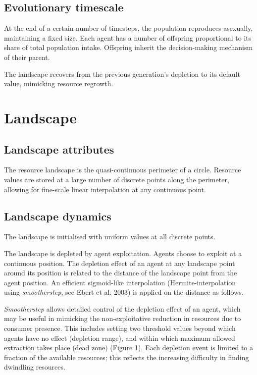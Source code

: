 \hypertarget{evolutionary-timescale}{%
\subsection{Evolutionary timescale}\label{evolutionary-timescale}}

At the end of a certain number of timesteps, the population reproduces
asexually, maintaining a fixed size. Each agent has a number of
offspring proportional to its share of total population intake.
Offspring inherit the decision-making mechanism of their parent.

The landscape recovers from the previous generation's depletion to its
default value, mimicking resource regrowth.

\hypertarget{landscape}{%
\section{Landscape}\label{landscape}}

\hypertarget{landscape-attributes}{%
\subsection{Landscape attributes}\label{landscape-attributes}}

The resource landscape is the quasi-continuous perimeter of a circle.
Resource values are stored at a large number of discrete points along
the perimeter, allowing for fine-scale linear interpolation at any
continuous point.

\hypertarget{landscape-dynamics}{%
\subsection{Landscape dynamics}\label{landscape-dynamics}}

The landscape is initialised with uniform values at all discrete points.

The landscape is depleted by agent exploitation. Agents choose to
exploit at a continuous position. The depletion effect of an agent at
any landscape point around its position is related to the distance of
the landscape point from the agent position. An efficient sigmoid-like
interpolation (Hermite-interpolation using \emph{smootherstep}, see
Ebert et al. 2003) is applied on the distance as follows.

\emph{Smootherstep} allows detailed control of the depletion effect of
an agent, which may be useful in mimicking the non-exploitative
reduction in resources due to consumer presence. This includes setting
two threshold values beyond which agents have no effect (depletion
range), and within which maximum allowed extraction takes place (dead
zone) (Figure 1). Each depletion event is limited to a fraction of the
available resources; this reflects the increasing difficulty in finding
dwindling resources.

